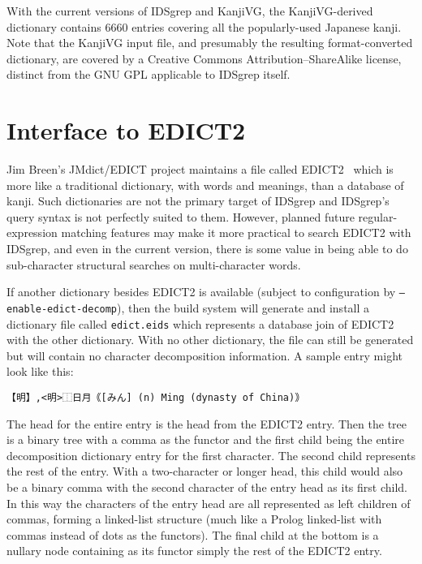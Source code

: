 \documentclass[twocolumn]{report}
\begin{document}
With the current versions of IDSgrep and KanjiVG, the KanjiVG-derived
dictionary contains 6660 entries covering all the popularly-used Japanese
kanji.  Note that the KanjiVG input file, and presumably the resulting
format-converted dictionary, are covered by a Creative Commons
Attribution--ShareAlike license, distinct from the GNU GPL applicable to
IDSgrep itself.


\section{Interface to EDICT2}

Jim Breen's JMdict/EDICT project maintains a file called
EDICT2~\cite{EDICT2} which is more like a traditional dictionary, with words
and meanings, than a database of kanji.  Such dictionaries are not the
primary target of IDSgrep and IDSgrep's query syntax is not perfectly suited
to them.  However, planned future regular-expression matching features may
make it more practical to search EDICT2 with IDSgrep, and even in the
current version, there is some value in being able to do sub-character
structural searches on multi-character words.

If another dictionary besides EDICT2 is available
(subject to configuration by \texttt{--enable-edict-decomp}), then the
build system will generate and install a
dictionary file called \texttt{edict.eids} which represents a database
join of EDICT2 with the other dictionary.  With no other dictionary,
the file can still be generated but will contain no character decomposition
information.
A sample entry might look like this:
\begin{verbatim}
【明】,<明>⿰日月｟[みん] (n) Ming (dynasty of China)｠
\end{verbatim}

The head for the entire entry is the head from the EDICT2 entry.  Then the
tree is a binary tree with a comma as the functor and the first child being
the entire decomposition dictionary entry for the first character.  The
second child represents the rest of the entry.  With a two-character or
longer head, this child would also be a binary comma with the second
character of the entry head as its first child.  In this way the characters
of the entry head are all represented as left children of commas, forming a
linked-list structure (much like a Prolog linked-list with commas instead of
dots as the functors).  The final child at the bottom is a nullary node
containing as its functor simply the rest of the EDICT2 entry.
\end{document}
